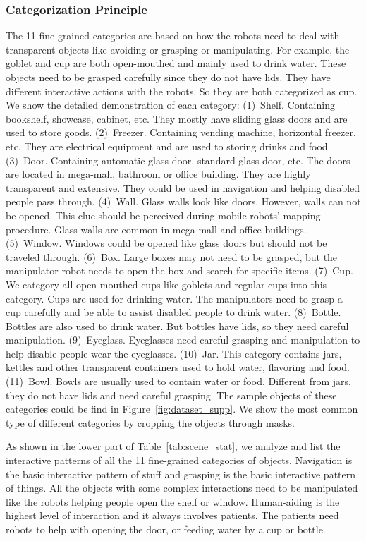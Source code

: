 \documentclass{article}
\begin{document}
\subsubsection{Categorization Principle}
The 11 fine-grained categories are based on how the robots need to deal with transparent objects like avoiding or grasping or manipulating. 
For example, the goblet and cup are both open-mouthed and mainly used to drink water. These objects need to be grasped carefully since they do not have lids.  They have different interactive actions with the robots. So they are both categorized as cup.
We show the detailed demonstration of each category:
(1)~Shelf. Containing bookshelf, showcase, cabinet, etc. They mostly have sliding glass doors and are used to store goods. 
(2)~Freezer. Containing vending machine,
horizontal freezer, etc. They are electrical equipment and are used to storing drinks and food.
(3)~Door. Containing automatic glass door, standard glass door, etc. The doors are located in mega-mall, bathroom or office building. They are highly transparent and extensive. They could be used in navigation and helping disabled people pass through.
(4)~Wall. Glass walls look like doors. However, walls can not be opened. This clue should be perceived during mobile robots' mapping procedure. Glass walls are common in mega-mall and office buildings.
(5)~Window. Windows could be opened like glass doors but should not be traveled through. 
(6)~Box. Large boxes may not need to be grasped, but the manipulator robot needs to open the box and search for specific items.
(7)~Cup. We category all open-mouthed cups like goblets and regular cups into this category. Cups are used for drinking water. The manipulators need to grasp a cup carefully and be able to assist disabled people to drink water.
(8)~Bottle. Bottles are also used to drink water. But bottles have lids, so they need careful manipulation.
(9)~Eyeglass. Eyeglasses need careful grasping and manipulation to help disable people wear the eyeglasses.
(10)~Jar. This category contains jars, kettles and other transparent containers used to hold water, flavoring and food.
(11)~Bowl. Bowls are usually used to contain water or food. Different from jars, they do not have lids and need careful grasping.
The sample objects of these categories could be find in Figure~\ref{fig:dataset_supp}. We show the most common type of different categories by cropping the objects through masks.

As shown in the lower part of Table~\ref{tab:scene_stat}, we analyze and list the interactive patterns of all the 11 fine-grained categories of objects. Navigation is the basic interactive pattern of stuff and grasping is the basic interactive pattern of things. All the objects with some complex interactions need to be manipulated like the robots helping people open the shelf or window. Human-aiding is the highest level of interaction and it always involves patients. The patients need robots to help with opening the door, or feeding water by a cup or bottle.
\end{document}
